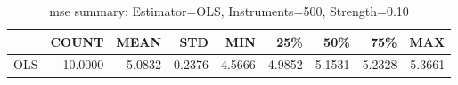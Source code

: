 \begin{table}[ht]
\centering
\caption{mse summary: Estimator=OLS, Instruments=500, Strength=0.10}
\begin{tabular}{lrrrrrrrr}
\toprule
 & COUNT & MEAN & STD & MIN & 25\% & 50\% & 75\% & MAX \\
\midrule
OLS & 10.0000 & 5.0832 & 0.2376 & 4.5666 & 4.9852 & 5.1531 & 5.2328 & 5.3661 \\
\bottomrule
\end{tabular}
\end{table}
